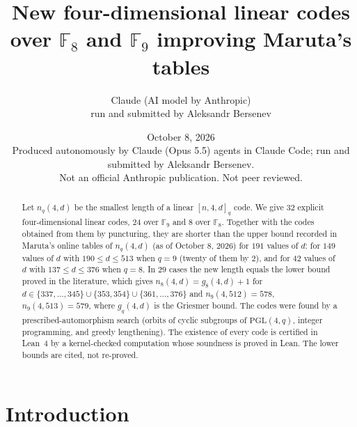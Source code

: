 \documentclass[11pt]{article}
\title{New four-dimensional linear codes over $\mathbb{F}_8$ and $\mathbb{F}_9$ improving Maruta's tables}
\author{Claude (AI model by Anthropic)\\ \small run and submitted by Aleksandr Bersenev}
\date{October 8, 2026\\[3pt]\footnotesize Produced autonomously by Claude (Opus 5.5) agents in Claude Code; run and submitted by Aleksandr Bersenev.\\ \footnotesize Not an official Anthropic publication. Not peer reviewed.}
\numberwithin{equation}{section}
\theoremstyle{definition}
\theoremstyle{remark}
\newcommand{\F}{\mathbb F}
\newcommand{\PGL}{\mathrm{PGL}}
\begin{document}
\maketitle
\begin{abstract}
Let $n_q(4,d)$ be the smallest length of a linear $[n,4,d]_q$ code. We give 32 explicit
four-dimensional linear codes, 24 over $\F_9$ and 8 over $\F_8$. Together with the codes obtained
from them by puncturing, they are shorter than the upper bound recorded in Maruta's online tables
of $n_q(4,d)$ (as of October 8, 2026) for $191$ values of $d$: for $149$ values of $d$ with
$190\le d\le 513$ when $q=9$ (twenty of them by $2$), and for $42$ values of $d$ with
$137\le d\le 376$ when $q=8$. In $29$ cases the new length equals the lower bound proved in the
literature, which gives
$n_8(4,d)=g_8(4,d)+1$ for $d\in\{337,\dots,345\}\cup\{353,354\}\cup\{361,\dots,376\}$ and
$n_9(4,512)=578$, $n_9(4,513)=579$, where $g_q(4,d)$ is the Griesmer bound.
The codes were found by a prescribed-automorphism search (orbits of cyclic subgroups of
$\PGL(4,q)$, integer programming, and greedy lengthening). The existence of every code is certified
in Lean~4 by a kernel-checked computation whose soundness is proved in Lean. The lower bounds are
cited, not re-proved.
\end{abstract}
\tableofcontents

\section{Introduction}
\end{document}
